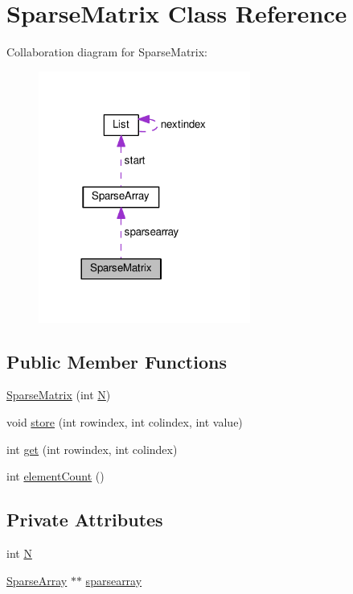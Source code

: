 \hypertarget{classSparseMatrix}{}\section{Sparse\+Matrix Class Reference}
\label{classSparseMatrix}


Collaboration diagram for Sparse\+Matrix\+:
\nopagebreak
\begin{figure}[H]
\begin{center}
\leavevmode
\includegraphics[width=197pt]{classSparseMatrix__coll__graph}
\end{center}
\end{figure}
\subsection*{Public Member Functions}
\begin{DoxyCompactItemize}
\item 
\hyperlink{classSparseMatrix_aa4635499909974beecdcf753342a0f15}{Sparse\+Matrix} (int \hyperlink{classSparseMatrix_a4295e15f08092c633480eff6527918ab}{N})
\item 
void \hyperlink{classSparseMatrix_a4e3b9721dcd31b6db675ab1fba2a83a3}{store} (int rowindex, int colindex, int value)
\item 
int \hyperlink{classSparseMatrix_a2e75c91152fd4f552b010b11aa04a6df}{get} (int rowindex, int colindex)
\item 
int \hyperlink{classSparseMatrix_ab81c07a21a8a25c953d9bd37773da4ee}{element\+Count} ()
\end{DoxyCompactItemize}
\subsection*{Private Attributes}
\begin{DoxyCompactItemize}
\item 
int \hyperlink{classSparseMatrix_a4295e15f08092c633480eff6527918ab}{N}
\item 
\hyperlink{classSparseArray}{Sparse\+Array} $\ast$$\ast$ \hyperlink{classSparseMatrix_a20f42dd05e85c614190cd5c61c478ea0}{sparsearray}
\end{DoxyCompactItemize}


